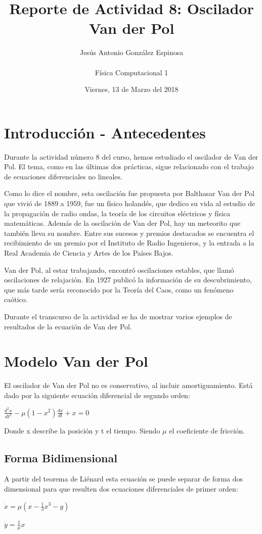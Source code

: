 \documentclass[a4paper]{article}
\title{Reporte de Actividad 8: Oscilador Van der Pol}
\author{Jesús Antonio González Espinosa \\ \\ Física Computacional 1}
\date{Viernes, 13 de Marzo del 2018}
\begin{document}
\maketitle
\section{Introducción - Antecedentes}

Durante la actividad número 8 del curso, hemos estudiado el oscilador de Van der Pol. El tema, como en las últimas dos prácticas, sigue relacionado con el trabajo de ecuaciones diferenciales no lineales. 

Como lo dice el nombre, esta oscilación fue propuesta por Balthasar Van der Pol que vivió de 1889 a 1959, fue un físico holandés, que dedico su vida al estudio de la propagación de radio ondas, la teoría de los circuitos eléctricos y física matemáticas. Además de la oscilación de Van der Pol, hay un meteorito que también lleva su nombre. Entre sus sucesos y premios destacados se encuentra el recibimiento de un premio por el Instituto de Radio Ingenieros, y la entrada a la Real Academia de Ciencia y Artes de los Países Bajos. 

Van der Pol, al estar trabajando, encontró oscilaciones estables, que llamó oscilaciones de relajación. En 1927 publicó la información de su descubrimiento, que más tarde sería reconocido por la Teoría del Caos, como un fenómeno caótico. 

Durante el transcurso de la actividad se ha de mostrar varios ejemplos de resultados de la ecuación de Van der Pol. 

\section{Modelo Van der Pol}

El oscilador de Van der Pol no es conservativo, al incluir amortiguamiento. Está dado por la siguiente ecuación diferencial de segundo orden:
\begin{center}
$\frac{d^2x}{dt^2} - \mu (1 - x^2)\frac{dx}{dt} + x = 0$
\end{center}

Donde x describe la posición y t el tiempo. Siendo $\mu$ el coeficiente de fricción.  

\subsection{Forma Bidimensional}
A partir del teorema de Liénard esta ecuación se puede separar de forma dos dimensional para que resulten dos ecuaciones diferenciales de primer orden:
\begin{center}
$\dot{x} = \mu (x - \frac{1}{3} x^3 - y)$

$\dot{y} = \frac{1}{\mu} x$
\end{center}
\end{document}
